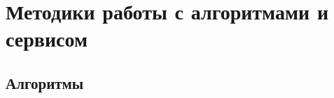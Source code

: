 \chapter{Методики работы с алгоритмами и сервисом} \label{ch:ch4}

\section{Алгоритмы} \label{ch:ch4/sect1}

\clearpage